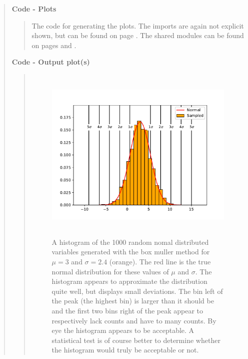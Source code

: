 \begin{quote}
\begin{quote}
\end{quote}

\textbf{Code - Plots}

\begin{quote}
The code for generating the plots. The imports are again not explicit shown, but can be found on page \pageref{CODE:MAIN1}. The shared modules can be found on pages \pageref{CODE:RNG} and \pageref{CODE:Statistics}. 



\end{quote}


\textbf{Code - Output plot(s)}
\begin{quote}
\begin{figure}[!ht]
\centering
\includegraphics[width=13cm, height=8.5cm]{./Plots/1_hist_gaussian.pdf}
\caption{A histogram of the 1000 random nomal distributed variables generated with the box muller method for $\mu = 3$ and $\sigma = 2.4$  (orange). The red line is the true normal distribution for these values of $\mu$ and $\sigma$.  The histogram appears to approximate the distribution quite well, but displays small deviations. The bin left of the peak (the highest bin) is larger than it should be and the first two bins right of the peak appear to respectively lack counts and have to many counts.  By eye the histogram appears to be acceptable. A statistical test is of course better to determine whether the histogram would truly be acceptable or not.}
\label{fig:normal}
\end{figure}

\end{quote}
\end{quote}

%

